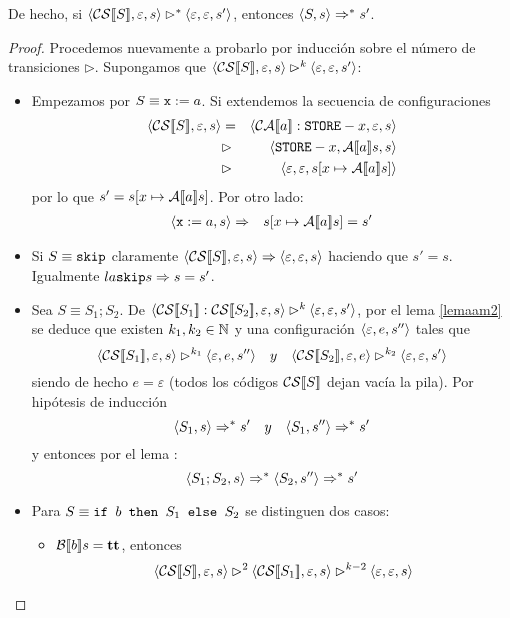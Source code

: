\begin{lema}
De hecho, si $\langle \mathcal{CS}[\![S]\!], \varepsilon, s \rangle\rhd^* \langle \varepsilon, \varepsilon, s' \rangle$, entonces $\langle S, s \rangle\Rightarrow^* s'$.
\begin{proof} Procedemos nuevamente a probarlo por inducción sobre el número de transiciones $\rhd$. Supongamos que $\langle \mathcal{CS}[\![S]\!], \varepsilon, s \rangle\rhd^k \langle \varepsilon, \varepsilon, s' \rangle$:
\begin{itemize}
    \item Empezamos por $S \equiv \texttt{x}:=a$. Si extendemos la secuencia de configuraciones
    \begin{eqnarray*}
        \conf{\fc{CS}{S}}{\varepsilon}{s} &=& \conf{\fc{CA}{a}:\n{STORE}-x}{\varepsilon}{s} \\
         &\rhd& \conf{\n{STORE}-x}{\fc{A}{a}s}{s} \\
         &\rhd& \conf{\varepsilon}{\varepsilon}{s[x\mapsto \fc{A}{a}s]}
    \end{eqnarray*}
    por lo que $s' = s[x\mapsto \mathcal{A}[\![a]\!]s]$. Por otro lado:
    \begin{eqnarray*}
        \langle \texttt{x} := a, s \rangle &\Rightarrow& s[x\mapsto \mathcal{A}[\![a]\!]s] = s'
    \end{eqnarray*}
    \item Si $S \equiv \texttt{skip}$ claramente $\langle \mathcal{CS}[\![S]\!], \varepsilon, s \rangle \Rightarrow \langle \varepsilon, \varepsilon, s \rangle$ haciendo que $s' = s$. Igualmente $la{\texttt{skip}}{s} \Rightarrow s = s'$.
    \item Sea $S \equiv S_1; S_2$. De $\langle \mathcal{CS}[\![S_1]\!]:\mathcal{CS}[\![S_2]\!], \varepsilon, s \rangle\rhd^k \langle \varepsilon, \varepsilon, s' \rangle$, por el lema \ref{lemaam2} se deduce que existen $k_1, k_2\in\mathbb{N}$ y una configuración $\langle \varepsilon, e, s'' \rangle$ tales que
    \[
        \conf{\fc{CS}{S_1}}{\varepsilon}{s}\rhd^{k_1} \conf{\varepsilon}{e}{s''}\ \ \ y\ \ \ \conf{\fc{CS}{S_2}}{\varepsilon}{e}\rhd^{k_2} \conf{\varepsilon}{\varepsilon}{s'}
    \]
    siendo de hecho $e = \varepsilon$ (todos los códigos $\mathcal{CS}[\![S]\!]$ dejan vacía la pila). Por hipótesis de inducción
    \[
        \langle S_1, s \rangle \Rightarrow^* s'\ \ \ y\ \ \ \langle S_1, s'' \rangle \Rightarrow^* s'
    \]
    y entonces por el lema \label{lemasos2}:
    \[
        \langle S_1;S_2, s \rangle \Rightarrow^* \langle S_2, s'' \rangle \Rightarrow^* s'
    \]
    \item Para $S\equiv \texttt{if } b \texttt{ then } S_1 \texttt{ else } S_2$ se distinguen dos casos:
    \begin{itemize}
        \item $\mathcal{B}[\![b]\!]s = \textbf{tt}$, entonces
        \[
             \langle \mathcal{CS}[\![S]\!], \varepsilon, s \rangle \rhd^2 \langle \mathcal{CS}[\![S_1]\!], \varepsilon, s \rangle \rhd^{k-2} \langle \varepsilon, \varepsilon, s \rangle
\]
\end{itemize}
\end{itemize}
\end{proof}
\end{lema}

